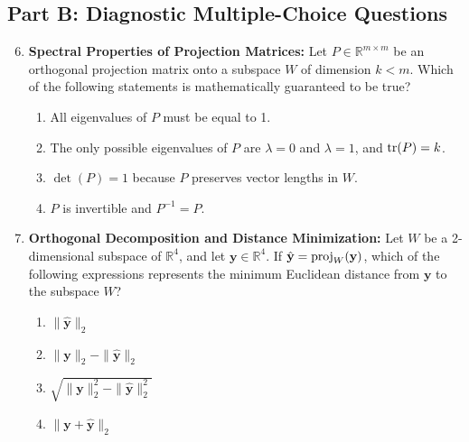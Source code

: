 \subsection*{Part B: Diagnostic Multiple-Choice Questions}
\begin{enumerate}
\setcounter{enumi}{5}
\item \textbf{Spectral Properties of Projection Matrices:} Let $P \in \mathbb{R}^{m \times m}$ be an orthogonal projection matrix onto a subspace $W$ of dimension $k < m$. Which of the following statements is mathematically guaranteed to be true?
\begin{enumerate}
    \item All eigenvalues of $P$ must be equal to 1.
    \item The only possible eigenvalues of $P$ are $\lambda = 0$ and $\lambda = 1$, and $\operatorname{tr}(P) = k$.
    \item $\det(P) = 1$ because $P$ preserves vector lengths in $W$.
    \item $P$ is invertible and $P^{-1} = P$.
\end{enumerate}

\item \textbf{Orthogonal Decomposition and Distance Minimization:} Let $W$ be a 2-dimensional subspace of $\mathbb{R}^4$, and let $\mathbf{y} \in \mathbb{R}^4$. If $\hat{\mathbf{y}} = \operatorname{proj}_W(\mathbf{y})$, which of the following expressions represents the minimum Euclidean distance from $\mathbf{y}$ to the subspace $W$?
\begin{enumerate}
    \item $\|\hat{\mathbf{y}}\|_2$
    \item $\|\mathbf{y}\|_2 - \|\hat{\mathbf{y}}\|_2$
    \item $\sqrt{\|\mathbf{y}\|_2^2 - \|\hat{\mathbf{y}}\|_2^2}$
    \item $\|\mathbf{y} + \hat{\mathbf{y}}\|_2$
\end{enumerate}
\end{enumerate}
